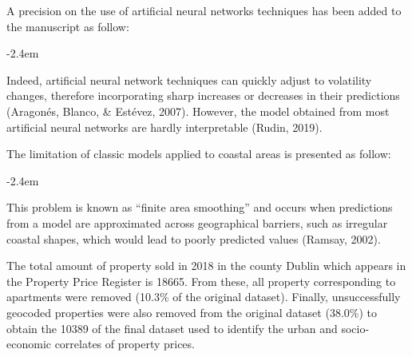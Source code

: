 \documentclass[]{article}
\renewenvironment{quote}{\begin{fquote}\advance\leftmargini -2.4em\begin{oldquote}}{\end{oldquote}\end{fquote}}
\newenvironment{fquote}
  {\def\FrameCommand{
	\fboxsep=0.6em %
	\fcolorbox{black}{white}}%
    \MakeFramed {\advance\hsize-2\width \FrameRestore}
    \begin{minipage}{\linewidth}
  }
  {\end{minipage}\endMakeFramed}
\begin{document}

A precision on the use of artificial neural networks techniques has been added to the manuscript as follow:

\begin{quote}
Indeed, artificial neural network techniques can quickly adjust to volatility changes, therefore incorporating sharp increases or decreases in their predictions (Aragonés, Blanco, \& Estévez, 2007). However, the model obtained from most artificial neural networks are hardly interpretable (Rudin, 2019).
\end{quote}

The limitation of classic models applied to coastal areas is presented as follow:

\begin{quote}
This problem is known as ``finite area smoothing'' and occurs when predictions from a model are approximated across geographical barriers, such as irregular coastal shapes, which would lead to poorly predicted values (Ramsay, 2002).
\end{quote}


The total amount of property sold in 2018 in the county Dublin which appears in the Property Price Register is 18665. From these, all property corresponding to apartments were removed (10.3\% of the original dataset). Finally, unsuccessfully geocoded properties were also removed from the original dataset (38.0\%) to obtain the 10389 of the final dataset used to identify the urban and socio-economic correlates of property prices.
\end{document}
